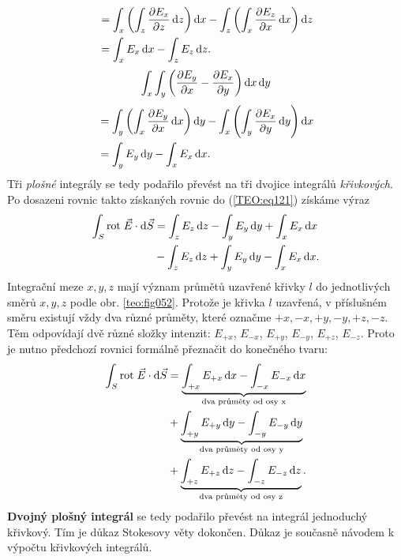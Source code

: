         \begin{align*}
           &= \int_x\left(\int_z\dfrac{\partial E_x}{\partial z}\mathop{}\!\mathrm{d}z\right)\mathop{}\!\mathrm{d}x 
            - \int_z\left(\int_x\dfrac{\partial E_z}{\partial x}\mathop{}\!\mathrm{d}x\right)\mathop{}\!\mathrm{d}z                  \\
           &= \int_xE_x\mathop{}\!\mathrm{d}x - \int_zE_z\mathop{}\!\mathrm{d}z.                              \\
        \end{align*}
        \begin{equation*}
          \int_x\int_y\left(\dfrac{\partial E_y}{\partial x} - \dfrac{\partial E_x}{\partial y}\right)\mathop{}\!\mathrm{d}x\mathop{}\!\mathrm{d}y
        \end{equation*}
        \begin{align*}
           &= \int_y\left(\int_x\dfrac{\partial E_y}{\partial x}\mathop{}\!\mathrm{d}x\right)\mathop{}\!\mathrm{d}y 
            - \int_x\left(\int_y\dfrac{\partial E_x}{\partial y}\mathop{}\!\mathrm{d}y\right)\mathop{}\!\mathrm{d}x                      \\
           &= \int_yE_y\mathop{}\!\mathrm{d}y - \int_xE_x\mathop{}\!\mathrm{d}x.         
        \end{align*}
        Tři \emph{plošné} integrály se tedy podařilo převést na tři dvojice integrálů 
        \emph{křivkových}. Po dosazeni rovnic takto získaných rovnic do (\ref{TEO:eq121}) 
        získáme výraz
        \begin{align*}
          \int_{S}\mathrm{rot}\;\vec{E}\cdot \mathop{}\!\mathrm{d}\vec{S} 
            &= \int_zE_z\mathop{}\!\mathrm{d}z - \int_yE_y\mathop{}\!\mathrm{d}y + \int_xE_x\mathop{}\!\mathrm{d}x                     \\
            &- \int_zE_z\mathop{}\!\mathrm{d}z + \int_yE_y\mathop{}\!\mathrm{d}y - \int_xE_x\mathop{}\!\mathrm{d}x.
        \end{align*}
        Integrační meze \(x, y, z\) mají význam průmětů uzavřené křivky \(l\) do jednotlivých směrů 
        \(x, y, z\) podle obr. \ref{teo:fig052}. Protože je křivka \(l\) 
        uzavřená, v příslušném směru existují vždy dva různé průměty, které označme \(+x, -x, +y, 
        -y, +z, -z\). Těm odpovídají dvě různé složky intenzit: \(E_{+x}\), \(E_{-x}\), \(E_{+y}\), 
        \(E_{-y}\), \(E_{+z}\), \(E_{-z}\). Proto je nutno předchozí rovnici formálně přeznačit do 
        konečného tvaru:
        \begin{align*}
          \int_{S}\mathrm{rot}\;\vec{E}\cdot \mathop{}\!\mathrm{d}\vec{S} 
             &= \underbrace{\int_{+x}E_{+x}\mathop{}\!\mathrm{d}x - \int_{-x}E_{-x}\mathop{}\!\mathrm{d}x}_\text{dva průměty od osy x}  \\
             &+ \underbrace{\int_{+y}E_{+y}\mathop{}\!\mathrm{d}y - \int_{-y}E_{-y}\mathop{}\!\mathrm{d}y}_\text{dva průměty od osy y}  \\ 
             &+ \underbrace{\int_{+z}E_{+z}\mathop{}\!\mathrm{d}z - \int_{-z}E_{-z}\mathop{}\!\mathrm{d}z}_\text{dva průměty od osy z}.
        \end{align*}
        \textbf{Dvojný plošný integrál} se tedy podařilo převést na integrál jednoduchý křivkový. 
        Tím je důkaz Stokesovy věty dokončen. Důkaz je současně návodem k výpočtu křivkových 
        integrálů.
        
